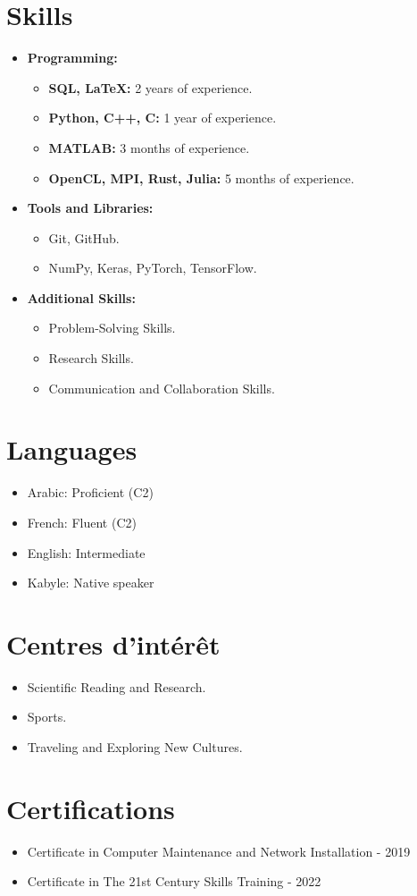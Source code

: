 \documentclass[a4paper,10pt]{article}
\begin{document}
\section*{Skills}
\begin{itemize}[leftmargin=*]
    \item \textbf{Programming:}
          \begin{itemize}
            \item \textbf{SQL, LaTeX:} 2 years of experience.
            \item \textbf{Python, C++, C:} 1 year of experience.
            \item \textbf{MATLAB:} 3 months of experience.
            \item \textbf{OpenCL, MPI, Rust, Julia:} 5 months of experience. 
          \end{itemize}
    \item \textbf{Tools and Libraries:}
          \begin{itemize}
              \item Git, GitHub.
              \item NumPy, Keras, PyTorch, TensorFlow.
          \end{itemize}
    \item \textbf{Additional Skills:}
          \begin{itemize}
              \item Problem-Solving Skills.
              \item Research Skills.
              \item Communication and Collaboration Skills.
          \end{itemize}      
\end{itemize}

\section*{Languages}
\begin{itemize}[leftmargin=*]
    \item Arabic: Proficient (C2)
    \item French: Fluent (C2)
    \item English: Intermediate
    \item Kabyle: Native speaker
\end{itemize}

\section*{Centres d'intérêt}
\begin{itemize}[leftmargin=*]
    \item Scientific Reading and Research.
    \item Sports.
    \item Traveling and Exploring New Cultures.
\end{itemize}



\section*{Certifications}
\begin{itemize}[leftmargin=*]
    \item Certificate in Computer Maintenance and Network Installation - 2019
    \item Certificate in The 21st Century Skills Training - 2022
\end{itemize}
\end{document}
